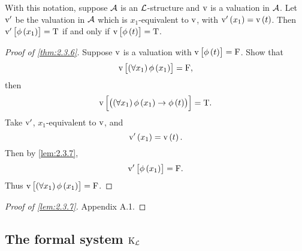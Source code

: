 \begin{lemma}
\label{lem:2.3.7}
With this notation, suppose $ \mathcal{A} $ is an $ \mathcal{L} $-structure and $ \mathrm{v} $ is a valuation in $ \mathcal{A} $. Let $ \mathrm{v}' $ be the valuation in $ \mathcal{A} $ which is $ x_1 $-equivalent to $ \mathrm{v} $, with $ \v'\br{x_1} = \v\br{t} $. Then $ \v'\sbr{\phi\br{x_1}} = \T $ if and only if $ \v\sbr{\phi\br{t}} = \T $.
\end{lemma}

\begin{proof}[Proof of \ref{thm:2.3.6}]
Suppose $ \mathrm{v} $ is a valuation with $ \v\sbr{\phi\br{t}} = \F $. Show that
$$ \v\sbr{\fab{x_1}\phi\br{x_1}} = \F, $$
then
$$ \v\sbr{\impb{\fab{x_1}\phi\br{x_1}}{\phi\br{t}}} = \T. $$
Take $ \mathrm{v}' $, $ x_1 $-equivalent to $ \mathrm{v} $, and
$$ \v'\br{x_1} = \v\br{t}. $$
Then by \ref{lem:2.3.7},
$$ \v'\sbr{\phi\br{x_1}} = \F. $$
Thus $ \v\sbr{\fab{x_1}\phi\br{x_1}} = \F $.
\end{proof}

\begin{proof}[Proof of \ref{lem:2.3.7}]
Appendix A.1.
\end{proof}

\pagebreak

\subsection{The formal system \texorpdfstring{$ \mathrm{K}_{\mathcal{L}} $}{KL}}

